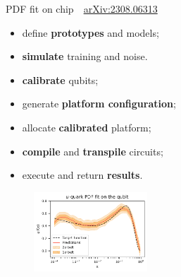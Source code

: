 \documentclass[aspectratio=169, 8pt, xcolor={svgnames}, hyperref={linkcolor=black}]{beamer}
\begin{document}
\begin{frame}{PDF fit on chip \hfill \faBook\,\, \href{https://arxiv.org/abs/2308.06313}{arXiv:2308.06313}}

\begin{multicols}{2}
\hspace{2cm}
\begin{tcolorbox}[title=High level API: Qibo, colback=blue!20]
\begin{itemize}[noitemsep]
\small
   \item[\faCode] define \textbf{prototypes} and models;
   \item[\faCode] \textbf{simulate} training and noise.
\end{itemize}
\end{tcolorbox}
\begin{tcolorbox}[title=Calibration: Qibocal, colback=yellow!20]
\begin{itemize}[noitemsep]
\small
   \item[\faCrosshairs] \textbf{calibrate} qubits;
   \item[\faCrosshairs] generate \textbf{platform configuration};
\end{itemize}
\end{tcolorbox}
\begin{tcolorbox}[title=Execution: Qibolab, colback=red!20]
\begin{itemize}[noitemsep]
\small
   \item[\faCog] allocate \textbf{calibrated} platform;
   \item[\faCog] \textbf{compile} and \textbf{transpile} circuits;
   \item[\faCog] execute and return \textbf{results}.
\end{itemize}
\end{tcolorbox}
\begin{figure}  
    \includegraphics[width=0.38\textwidth]{figures/qpdf.pdf}
\end{figure}
\begin{center}
\begin{table}
\vspace{-0.5cm}

\end{table}
\end{center}
\end{multicols}
\end{frame}
\end{document}
